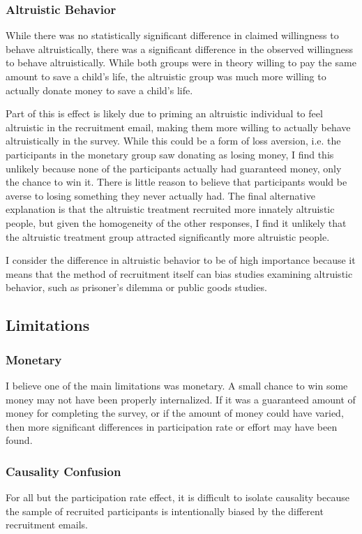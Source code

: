 \documentclass[12pt]{article}
\begin{document}
\subsubsection{Altruistic Behavior}
While there was no statistically significant difference in claimed willingness to behave altruistically, there was a significant difference in the observed willingness to behave altruistically. While both groups were in theory willing to pay the same amount to save a child's life, the altruistic group was much more willing to actually donate money to save a child's life. 

Part of this is effect is likely due to priming an altruistic individual to feel altruistic in the recruitment email, making them more willing to actually behave altruistically in the survey. While this could be a form of loss aversion, i.e. the participants in the monetary group saw donating as losing money, I find this unlikely because none of the participants actually had guaranteed money, only the chance to win it. There is little reason to believe that participants would be averse to losing something they never actually had. The final alternative explanation is that the altruistic treatment recruited more innately altruistic people, but given the homogeneity of the other responses, I find it unlikely that the altruistic treatment group attracted significantly more altruistic people. 

I consider the difference in altruistic behavior to be of high importance because it means that the method of recruitment itself can bias studies examining altruistic behavior, such as prisoner's dilemma or public goods studies. 

\subsection{Limitations}
\subsubsection{Monetary}
I believe one of the main limitations was monetary. A small chance to win some money may not have been properly internalized. If it was a guaranteed amount of money for completing the survey, or if the amount of money could have varied, then more significant differences in participation rate or effort may have been found. 

\subsubsection{Causality Confusion}
For all but the participation rate effect, it is difficult to isolate causality because the sample of recruited participants is intentionally biased by the different recruitment emails. 
\end{document}
